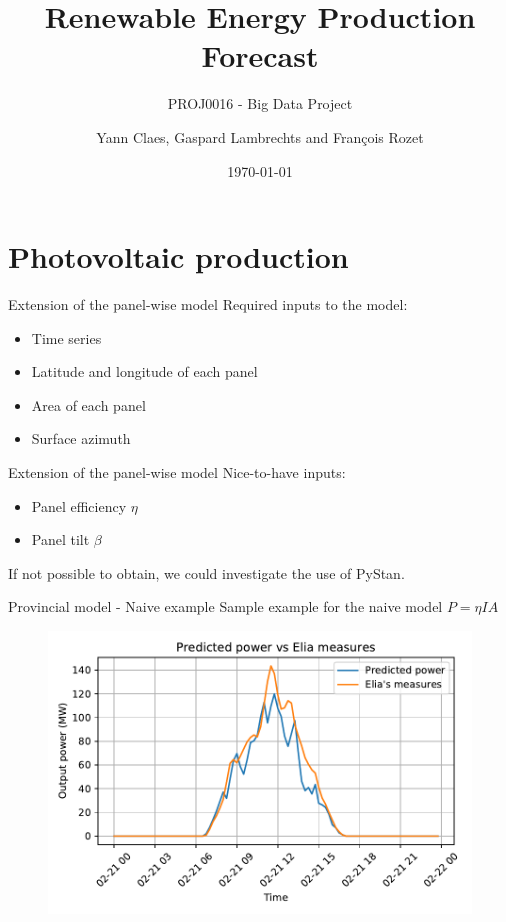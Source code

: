 \documentclass[12pt]{beamer}
\title{Renewable Energy Production Forecast}
\subtitle{PROJ0016 - Big Data Project}
\author{Yann Claes, Gaspard Lambrechts and François Rozet}
\institute{University of Liège}
\date{\today}
\begin{document}
\maketitle

\section{Photovoltaic production}

\begin{frame}{Extension of the panel-wise model}
    Required inputs to the model:
    \begin{itemize}
        \item Time series
        \item Latitude and longitude of each panel
        \item Area of each panel
        \item Surface azimuth
    \end{itemize}
\end{frame}

\begin{frame}{Extension of the panel-wise model}
    Nice-to-have inputs:
    \begin{itemize}
        \item Panel efficiency $\eta$
        \item Panel tilt $\beta$
    \end{itemize}
    If not possible to obtain, we could investigate the use of PyStan.
\end{frame}

\begin{frame}{Provincial model - Naive example}
    Sample example for the naive model $P = \eta I A$
    \begin{figure}
        \centering
        \includegraphics[width=.8\textwidth]{resources/pdf/province_example.pdf}
        \label{fig:province_example}
    \end{figure}
\end{frame}
\end{document}
